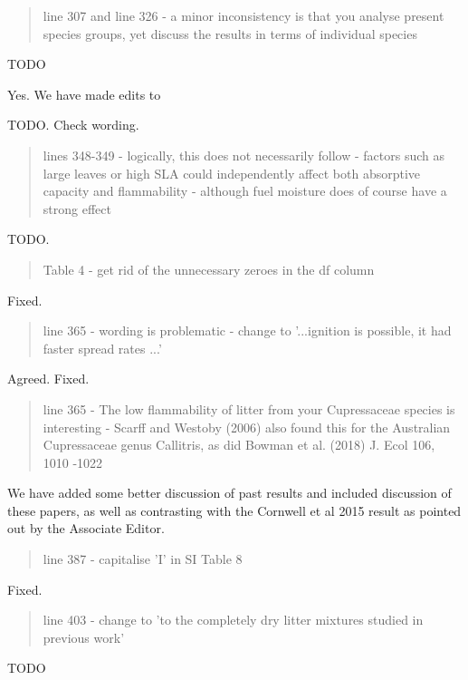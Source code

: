 \documentclass[letterpaper, 12pt]{letter}
\begin{document}
\begin{letter}{}
\begin{quote}
line 307 and line 326 - a minor inconsistency is that you analyse present species groups, yet discuss the results in terms of individual species
\end{quote}

TODO

Yes. We have made edits to

TODO. Check wording.



\begin{quote}
lines 348-349 - logically, this does not necessarily follow - factors such as large leaves or high SLA could independently affect both absorptive capacity and flammability - although fuel moisture does of course have a strong effect 
\end{quote}

TODO.


\begin{quote}
Table 4 - get rid of the unnecessary zeroes in the df column
\end{quote}

Fixed.

\begin{quote}
line 365 - wording is problematic - change to '...ignition is possible, it had faster spread rates ...'
\end{quote}

Agreed. Fixed.

\begin{quote}
line 365 - The low flammability of litter from your Cupressaceae species is interesting - Scarff and Westoby (2006) also found this for the Australian Cupressaceae genus Callitris, as did Bowman et al. (2018) J. Ecol 106, 1010 -1022
\end{quote}

We have added some better discussion of past results and included discussion of these papers, as well as contrasting with the Cornwell et al 2015 result as pointed out by the Associate Editor.

\begin{quote}
line 387 - capitalise 'I' in SI Table  8
\end{quote}

Fixed.

\begin{quote}
line 403 - change to 'to the completely dry litter mixtures studied in previous work'
\end{quote}

TODO



\end{letter}
\end{document}
